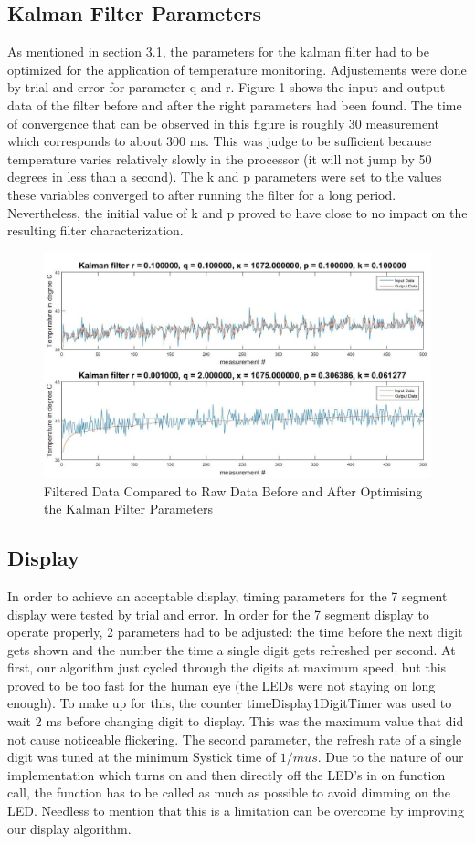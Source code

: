 \documentclass[12pt]{article}
\begin{document}
\subsection{Kalman Filter Parameters}
As mentioned in section 3.1, the parameters for the kalman filter had to be optimized for the application of temperature monitoring. Adjustements were done by trial and error for parameter q and r. Figure 1 shows the input and output data of the filter before and after the right parameters had been found. The time of convergence that can be observed in this figure is roughly 30 measurement which corresponds to about 300 ms. This was judge to be sufficient because temperature varies relatively slowly in the processor (it will not jump by 50 degrees in less than a second). The k and p parameters were set to the values these variables converged to after running the filter for a long period. Nevertheless, the initial value of k and p proved to have close to no impact on the resulting filter characterization.
\begin{figure}[!htb]
\centering
\includegraphics[scale=0.50]{images/kalmanfilter.jpg}
\caption{Filtered Data Compared to Raw Data Before and After Optimising the Kalman Filter Parameters}
\label{fig:kalmanfilter}
\end{figure}

\subsection{Display}
In order to achieve an acceptable display, timing parameters for the 7 segment display were tested by trial and error. In order for the 7 segment display to operate properly, 2 parameters had to be adjusted:  the time before the next digit gets shown and the number the time a single digit gets refreshed per second. At first, our algorithm just cycled through the digits at maximum speed, but this proved to be too fast for the human eye (the LEDs were not staying on long enough). To make up for this, the counter timeDisplay1DigitTimer was used to wait 2 ms before changing digit to display. This was the maximum value that did not cause noticeable flickering. The second parameter, the refresh rate of a single digit was tuned at the minimum Systick time of $1/mu s$. Due to the nature of our implementation which turns on and then directly off the LED's in on function call, the function has to be called as much as possible to avoid dimming on the LED. Needless to mention that this is a limitation can be overcome by improving our display algorithm.
\end{document}

